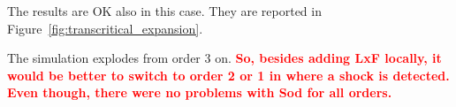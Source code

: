 \documentclass[english]{article}
\theoremstyle{thmstyleone}
\theoremstyle{thmstyletwo}
\theoremstyle{thmstylethree}
\begin{document}
The results are OK also in this case. They are reported in Figure~\ref{fig:transcritical_expansion}.

The simulation explodes from order 3 on.
\textcolor{red}{\textbf{So, besides adding LxF locally, it would be better to switch to order 2 or 1 in where a shock is detected. Even though, there were no problems with Sod for all orders.}}


\begin{figure}
	\centering
\end{figure}
\end{document}
